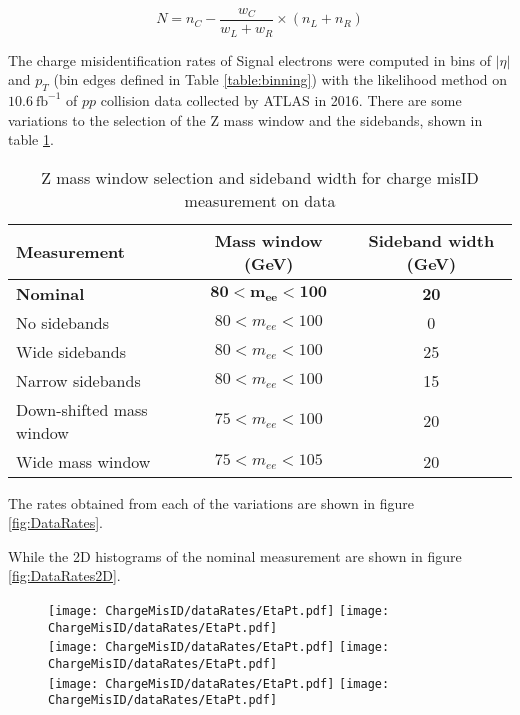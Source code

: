 $$N = n_C - \frac{w_C}{w_L + w_R} \times (n_L + n_R)$$

The charge misidentification rates of Signal electrons were computed in bins of $|\eta|$ and $p_T$ (bin edges defined in Table \ref{table:binning}) with the likelihood method on $10.6\  \text{fb}^{-1}$ of $pp$ collision data collected by ATLAS in 2016. There are some variations to the selection of the Z mass window and the sidebands, shown in table \ref{table:DataSelection}.

\begin{table}
\centering
\begin{tabular}{p{5cm} c c}
\textbf{Measurement} & \textbf{Mass window (GeV)} & \textbf{Sideband width (GeV)}\\
\hline
\textbf{Nominal}         & {$\mathbf{80 < m_{ee} < 100}$} & \textbf{20} \\
No sidebands             & $80 < m_{ee} < 100$            & 0           \\
Wide sidebands           & $80 < m_{ee} < 100$            & 25          \\
Narrow sidebands         & $80 < m_{ee} < 100$            & 15          \\
Down-shifted mass window & $75 < m_{ee} < 100$            & 20          \\
Wide mass window         & $75 < m_{ee} < 105$            & 20          \\
\end{tabular}
\caption{Z mass window selection and sideband width for charge misID measurement on data}
\label{table:DataSelection}
\end{table}

The rates obtained from each of the variations are shown in figure \ref{fig:DataRates}.

While the 2D histograms of the nominal measurement are shown in figure \ref{fig:DataRates2D}.

\begin{figure}[h]
\centering
\texttt{[image: ChargeMisID/dataRates/EtaPt.pdf]}
\texttt{[image: ChargeMisID/dataRates/EtaPt.pdf]}\\
\texttt{[image: ChargeMisID/dataRates/EtaPt.pdf]}
\texttt{[image: ChargeMisID/dataRates/EtaPt.pdf]}\\
\texttt{[image: ChargeMisID/dataRates/EtaPt.pdf]}
\texttt{[image: ChargeMisID/dataRates/EtaPt.pdf]}
\end{figure}

